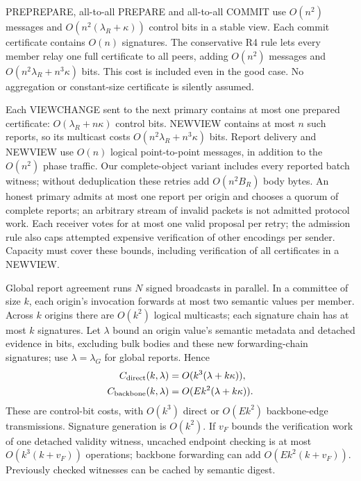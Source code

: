 \documentclass[11pt,a4paper,onecolumn]{article}
\theoremstyle{remark}\newtheorem{example}[definition]{Example}
\newcounter{protocol}
\begin{document}
PREPREPARE, all-to-all PREPARE and all-to-all COMMIT use $O(n^2)$ messages and
$O(n^2(\lambda_R+\kappa))$ control bits in a stable view. Each commit certificate
contains $O(n)$ signatures. The conservative R4 rule lets every member relay
one full certificate to all peers, adding $O(n^2)$ messages and
$O(n^2\lambda_R+n^3\kappa)$ bits. This cost is included even in the good case.
No aggregation or constant-size certificate is silently assumed.

Each VIEWCHANGE sent to the next primary contains at most one prepared
certificate: $O(\lambda_R+n\kappa)$ control bits. NEWVIEW contains at most $n$ such
reports, so its multicast costs $O(n^2\lambda_R+n^3\kappa)$ bits. Report delivery and
NEWVIEW use $O(n)$ logical point-to-point messages, in addition to the
$O(n^2)$ phase traffic. Our complete-object variant includes every reported
batch witness; without deduplication these retries add $O(n^2B_R)$ body bytes.
An honest primary admits at most one report per origin and chooses a quorum
of complete reports; an arbitrary stream of invalid packets is not admitted
protocol work. Each receiver votes for at most one valid proposal per retry; the admission
rule also caps attempted expensive verification of other encodings per sender. Capacity must cover
these bounds, including verification of all certificates in a NEWVIEW.

Global report agreement runs $N$ signed broadcasts in parallel. In a
committee of size $k$, each origin's invocation forwards at most two semantic
values per member. Across $k$ origins there are $O(k^2)$ logical multicasts;
each signature chain has at most $k$ signatures. Let $\lambda$ bound an
origin value's semantic metadata and detached evidence in bits, excluding bulk
bodies and these new forwarding-chain signatures; use $\lambda=\lambda_G$
for global reports. Hence
\begin{align}
 C_{\rm direct}(k,\lambda)&=O(k^3(\lambda+k\kappa)),\label{eq:directcost}\\
 C_{\rm backbone}(k,\lambda)&=O(Ek^2(\lambda+k\kappa)).\label{eq:backbonecost}
\end{align}
These are control-bit costs, with $O(k^3)$ direct or $O(Ek^2)$ backbone-edge
transmissions. Signature generation is $O(k^2)$. If $v_F$ bounds the verification
work of one detached validity witness, uncached endpoint checking is at most
$O(k^3(k+v_F))$ operations; backbone forwarding can add
$O(Ek^2(k+v_F))$. Previously checked witnesses can be cached by semantic digest.
\end{document}
